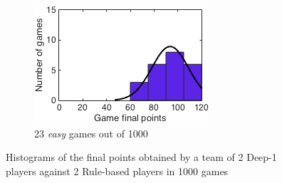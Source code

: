 \begin{figure}[h]
\begin{subfigure}[h]{0.32\textwidth}
                \includegraphics[width=\textwidth]{./img/appendix/histGeasy}
                \caption{23 \emph{easy} games out of 1000}
                \label{app:histGeasy}
        \end{subfigure}
        \caption[Histograms of the final points obtained in scenario (g) for \emph{hard}, \emph{medium} and \emph{easy} hands]{Histograms of the final points obtained by a team of 2 Deep-1 players against 2 Rule-based players in 1000 games}
        \label{app:histogramsG}
\end{figure}


